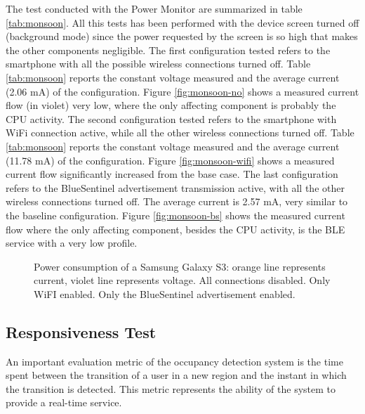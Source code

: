 The test conducted with the Power Monitor are summarized in table \ref{tab:monsoon}. All this tests has been performed with the device screen turned off (background mode) since the power requested by the screen is so high that makes the other components negligible. The first configuration tested refers to the smartphone with all the possible wireless connections turned off. Table \ref{tab:monsoon} reports the constant voltage measured and the average current (2.06 mA) of the configuration. Figure \ref{fig:monsoon-no} shows a measured current flow (in violet) very low, where the only affecting component is probably the CPU activity.
The second configuration tested refers to the smartphone with WiFi connection active, while all the other wireless connections turned off. Table \ref{tab:monsoon} reports the constant voltage measured and the average current (11.78 mA) of the configuration. Figure \ref{fig:monsoon-wifi} shows a measured current flow significantly increased from the base case. The last configuration refers to the BlueSentinel advertisement transmission active, with all the other wireless connections turned off. The average current is 2.57 mA, very similar to the baseline configuration. Figure \ref{fig:monsoon-bs} shows the measured current flow where the only affecting component, besides the CPU activity, is the BLE service with a very low profile.

\begin{figure}
\centering
{}
\newline
{}
\newline
{}
\caption[Power consumption of a Samsung Galaxy S3.]{Power consumption of a Samsung Galaxy S3: orange line represents current, violet line represents voltage. \protect{} All connections disabled. \protect{} Only WiFI enabled. \protect{} Only the BlueSentinel advertisement enabled.}
\label{fig:monsoon-graph}
\end{figure}


\subsection{Responsiveness Test}
\label{test-resp}
An important evaluation metric of the occupancy detection system is the time spent between the transition of a user in a new region and the instant in which the transition is detected. This metric represents the ability of the system to provide a real-time service.

